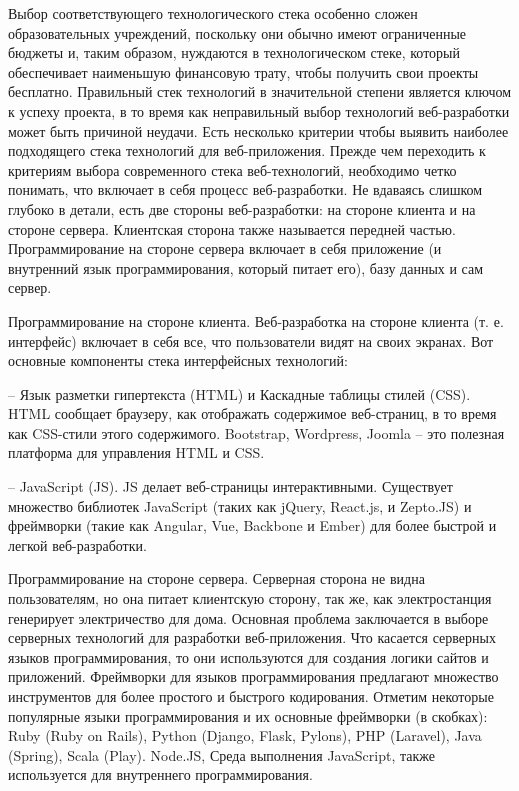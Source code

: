 Выбор соответствующего технологического стека особенно сложен образовательных учреждений, поскольку они обычно имеют ограниченные бюджеты и, таким образом, нуждаются в технологическом стеке, который обеспечивает наименьшую финансовую трату, чтобы получить свои проекты бесплатно.
Правильный стек технологий в значительной степени является ключом к успеху проекта, в то время как неправильный выбор технологий веб-разработки может быть причиной неудачи.
Есть несколько критерии чтобы выявить наиболее подходящего стека технологий для веб-приложения.
Прежде чем переходить к критериям выбора современного стека веб-технологий, необходимо четко понимать, что включает в себя процесс веб-разработки.
Не вдаваясь слишком глубоко в детали, есть две стороны веб-разработки: на стороне клиента и на стороне сервера.
Клиентская сторона также называется передней частью.
Программирование на стороне сервера включает в себя приложение (и внутренний язык программирования, который питает его), базу данных и сам сервер.

Программирование на стороне клиента.
Веб-разработка на стороне клиента (т. е. интерфейс) включает в себя все, что пользователи видят на своих экранах. Вот основные компоненты стека интерфейсных технологий:

-- Язык разметки гипертекста (HTML) и Каскадные таблицы стилей (CSS).
HTML сообщает браузеру, как отображать содержимое веб-страниц, в то время как CSS-стили этого содержимого.
Bootstrap, Wordpress, Joomla – это полезная платформа для управления HTML и CSS.

-- JavaScript (JS). JS делает веб-страницы интерактивными.
Существует множество библиотек JavaScript (таких как jQuery, React.js, и Zepto.JS) и фреймворки (такие как Angular, Vue, Backbone и Ember) для более быстрой и легкой веб-разработки.

Программирование на стороне сервера.
Серверная сторона не видна пользователям, но она питает клиентскую сторону, так же, как электростанция генерирует электричество для дома.
Основная проблема заключается в выборе серверных технологий для разработки веб-приложения.
Что касается серверных языков программирования, то они используются для создания логики сайтов и приложений.
Фреймворки для языков программирования предлагают множество инструментов для более простого и быстрого кодирования.
Отметим некоторые популярные языки программирования и их основные фреймворки (в скобках): Ruby (Ruby on Rails), Python (Django, Flask, Pylons), PHP (Laravel), Java (Spring), Scala (Play).
Node.JS, Среда выполнения JavaScript, также используется для внутреннего программирования.

